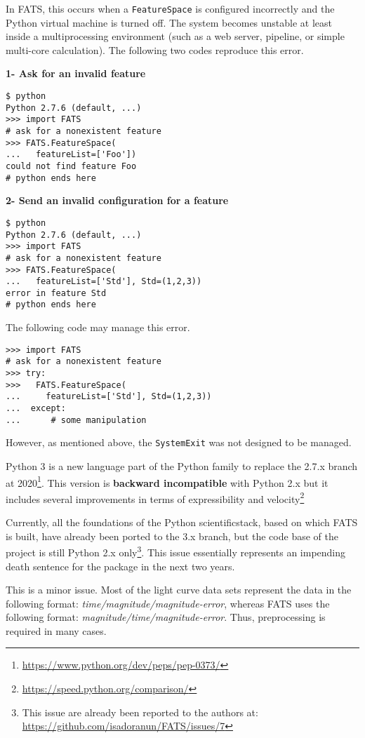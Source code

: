\documentclass[final,5p,times,twocolumn,authoryear]{elsarticle}
\begin{document}
\begin{description}
In FATS, this occurs when a \texttt{FeatureSpace} 
is configured incorrectly and the Python virtual machine
is turned off. 
%
The system becomes unstable at 
least inside a multiprocessing environment (such as a web server, 
pipeline, or simple multi-core calculation). 
%
The following two codes reproduce this error.

\textbf{1- Ask for an invalid feature}
\begin{verbatim}
$ python
Python 2.7.6 (default, ...) 
>>> import FATS
# ask for a nonexistent feature
>>> FATS.FeatureSpace(
...   featureList=['Foo'])
could not find feature Foo
# python ends here
\end{verbatim}

\textbf{2- Send an invalid configuration for a feature}
\begin{verbatim}
$ python
Python 2.7.6 (default, ...) 
>>> import FATS
# ask for a nonexistent feature
>>> FATS.FeatureSpace(
...   featureList=['Std'], Std=(1,2,3))
error in feature Std
# python ends here
\end{verbatim}

The following code may manage this error.
\begin{verbatim}
>>> import FATS
# ask for a nonexistent feature
>>> try:
>>>   FATS.FeatureSpace(
...     featureList=['Std'], Std=(1,2,3))
...  except:
...      # some manipulation
\end{verbatim}
However, as mentioned above, the \texttt{SystemExit} was not designed to be managed.

\item [Python 3]
Python 3 is a new language part of the Python family to 
replace the 2.7.x branch at 2020\footnote{\url{https://www.python.org/dev/peps/pep-0373/}}. 
%
This version is \textbf{backward incompatible} with Python 2.x 
but it includes several improvements in terms of expressibility and 
velocity\footnote{\url{https://speed.python.org/comparison/}}

Currently, all the foundations of the Python scientific\-stack, based on which FATS is built, 
have already been ported to the 3.x branch, but the code base of the project is still 
Python 2.x only\footnote{This issue are already been reported to the authors at: 
\url{https://github.com/isadoranun/FATS/issues/7}}. 
%
This issue essentially represents an impending death sentence for the package in the next two years.

\item [Light Curve Order]
%
This is a minor issue. Most of the light curve data sets represent the data 
in the following format: \textit{time/magnitude/magnitude-error}, whereas FATS uses the following format: 
\textit{magnitude/time/magnitude-error}. Thus, preprocessing is required in many cases. 


\end{description}
\end{document}
